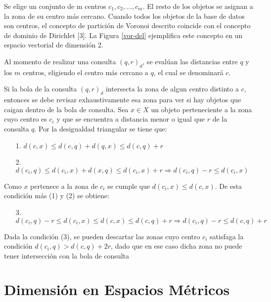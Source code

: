 Se elige un conjunto de m centros ${c_1,c_2,...,c_m}$. El resto de los objetos se asignan a la zona de su centro m\'as cercano. Cuando todos los objetos de la base de datos son centros, el concepto de partici\'on de Voronoi descrito coincide con el concepto de dominio de Dirichlet [3]. La Figura \ref{vor-del} ejemplifica este concepto en un espacio vectorial 
de dimensi\'on 2.


Al momento de realizar una consulta $(q, r)_d$, se eval\'uan las distancias entre $q$ y los $m$ centros, eligiendo el centro m\'as cercano a $q$, el cual se denominar\'a $c$.

Si la bola de la consulta $(q, r)_d$ intersecta la zona de algun centro distinto a $c$, entonces se debe revisar exhaustivamente esa zona para ver si hay objetos que caigan dentro de la bola de consulta. Sea $x \in X$ un objeto perteneciente a la zona cuyo centro es $c_i$ y que se encuentra a distancia menor o igual que $r$ de la consulta $q$. Por la desigualdad triangular se tiene que:

\begin{enumerate}
\item [1.] $d(c,x) \leq d(c,q) + d(q,x) \leq d(c,q) + r$
\item [2.]$d(c_i,q) \leq d(c_i,x) + d(x,q) \leq d(c_i,x) + r  \Rightarrow d(c_i,q) - r \leq d(c_i,x)$
\end{enumerate}

Como $x$ pertenece a la zona de $c_i$ se cumple que  $d(c_i,x) \leq d(c,x)$. De esta condici\'on m\'as (1) y (2) se obtiene:

\begin{enumerate}
\item [3.] $d(c_i,q) - r \leq d(c_i,x) \leq d(c,x) \leq d(c,q) + r \Rightarrow d(c_i,q) - r \leq d(c,q) + r$
\end{enumerate}

Dada la condici\'on (3), se pueden descartar las zonas cuyo centro $c_i$ satisfaga la condici\'on $d(c_i,q)  > d(c,q) +2r$, dado que en ese caso dicha zona no puede tener intersecci\'on con la bola de consulta




\section{Dimensi\'on en Espacios M\'etricos}

